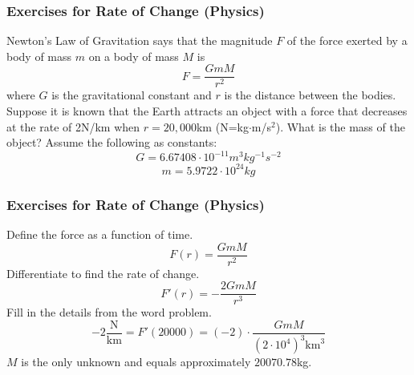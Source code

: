 \documentclass[xcolor=dvipsnames]{beamer}
\begin{document}
\begin{frame}
  \frametitle{Exercises for Rate of Change (Physics)}
Newton's Law of Gravitation says that the magnitude $F$ of the force
exerted by a body of mass $m$ on a body of mass $M$ is 
\begin{equation}
  \label{eq:zeipouqu}
  F=\frac{GmM}{r^{2}}
\end{equation}
where $G$ is the gravitational constant and $r$ is the distance
between the bodies. Suppose it is known that the Earth attracts an
object with a force that decreases at the rate of 2N/km when
$r=20,000$km (N=kg$\cdot$m/s$^{2}$). What is the mass of the object?
Assume the following as constants:
\begin{equation}
  \label{eq:phosulee}
  G=6.67408\cdot{}10^{-11}m^{3}kg^{-1}s^{-2}
\end{equation}
\begin{equation}
  \label{eq:otienaix}
  m=5.9722\cdot{}10^{24}kg
\end{equation}
\end{frame}

\begin{frame}
  \frametitle{Exercises for Rate of Change (Physics)}
  Define the force as a function of time.
  \begin{equation}
    \label{eq:ohseesie}
    F(r)=\frac{GmM}{r^{2}}
  \end{equation}
  Differentiate to find the rate of change.
  \begin{equation}
    \label{eq:eiphaila}
    F'(r)=-\frac{2GmM}{r^{3}}
  \end{equation}
  Fill in the details from the word problem.
  \begin{equation}
    \label{eq:luzielee}
    -2\frac{\mbox{N}}{\mbox{km}}=F'(20000)=(-2)\cdot\frac{GmM}{\left(2\cdot{}10^{4}\right)^{3}\mbox{km}^{3}}
  \end{equation}
  $M$ is the only unknown and equals approximately $20070.78$kg.
\end{frame}
\end{document}
